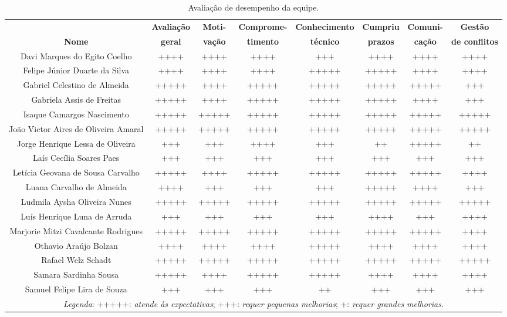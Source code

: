 \begin{landscape}
\begin{table}[htpb]
\footnotesize
\begin{center}
\caption{Avaliação de desempenho da equipe.}
\begin{tabular}{|c|c|c|c|c|c|c|c|}
\hline
& \textbf{Avaliação} & \textbf{Moti-} & \textbf{Comprome-} & \textbf{Conhecimento} & \textbf{Cumpriu} & \textbf{Comuni-} & \textbf{Gestão} \\
\textbf{Nome} & \textbf{geral} & \textbf{vação} & \textbf{timento} & \textbf{técnico} & \textbf{prazos} & \textbf{cação} & \textbf{de conflitos} \\ \hline
Davi Marques do Egito Coelho & ++++ & ++++ & ++++ & +++ & ++++ & ++++ & ++++ \\ \hline
Felipe Júnior Duarte da Silva & ++++ & ++++ & ++++ & +++++ & +++++ & ++++ & ++++ \\ \hline
Gabriel Celestino de Almeida & +++++ & ++++ & +++++ & +++++ & +++++ & +++++ & +++ \\\hline
Gabriela Assis de Freitas  & +++++ & ++++ &  +++++ & +++++ & +++++ & ++++ & +++  \\ \hline
Isaque Camargos Nascimento & +++++ & +++++ & +++++ & +++++ & +++++ & +++++ & +++++    \\ \hline
João Victor Aires de Oliveira Amaral & +++++ & +++++ & +++++ & +++++ & +++++ & +++++ &  +++++   \\ \hline
Jorge Henrique Lessa de Oliveira & +++ & +++ & ++++ & +++ & ++ & +++++ & ++    \\ \hline
Laís Cecília Soares Paes & +++ & +++ & +++ & +++ & +++ & +++ & +++    \\ \hline
Letícia Geovana de Sousa Carvalho & +++++ & ++++ & +++++ & +++++ & +++++ & +++++ &  ++++   \\ \hline
Luana Carvalho de Almeida & ++++ & +++ & +++ & +++ & +++++ & ++++ & +++    \\ \hline
Ludmila Aysha Oliveira Nunes & +++++ & +++++ & +++++ & +++++ & +++++ & +++++ & +++++    \\ \hline
Luís Henrique Luna de Arruda & +++ & +++ & +++ & +++ & ++++ & +++ & ++++    \\ \hline
Marjorie Mitzi Cavalcante Rodrigues & +++++ & +++++ & +++++ & +++++ & +++++ & +++++ & ++++    \\ \hline
Othavio Araújo Bolzan & ++++ & ++++ & ++++ & +++++ & ++++ & ++++ & ++++    \\ \hline
Rafael Welz Schadt & +++++ & +++++ & +++++ & +++++ & +++++ & +++++ & +++++    \\ \hline
Samara Sardinha Sousa & +++++ & ++++ & +++++ & +++++ & ++++ & ++++ & ++++    \\ \hline
Samuel Felipe Lira de Souza & +++ & +++ & +++ & ++ & +++ & +++ & +++    \\ \hline

\multicolumn{8}{c}{\textit{Legenda}: +++++: \textit{atende às expectativas}; +++: \textit{requer pequenas melhorias}; +: \textit{requer grandes melhorias}.} 

\end{tabular}
\end{center}
\end{table}

\end{landscape}